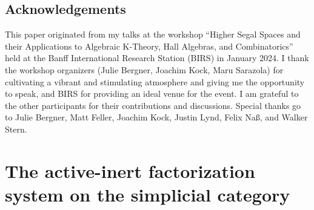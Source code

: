 \documentclass{conm-p-l}
\theoremstyle{definition}
\theoremstyle{remark}
\begin{document}
\subsection*{Acknowledgements}
This paper originated from my talks at the workshop ``Higher Segal Spaces and their Applications to Algebraic K-Theory, Hall Algebras, and Combinatorics'' held at the Banff International Research Station (BIRS) in January 2024.
I thank the workshop organizers (Julie Bergner, Joachim Kock, Maru Sarazola) for cultivating a vibrant and stimulating atmosphere and giving me the opportunity to speak, and BIRS for providing an ideal venue for the event.
I am grateful to the other participants for their contributions and discussions.
Special thanks go to Julie Bergner, Matt Feller, Joachim Kock, Justin Lynd, Felix Naß, and Walker Stern.

\section{The active-inert factorization system on the simplicial category}\label{sec act inert fact}
\end{document}
